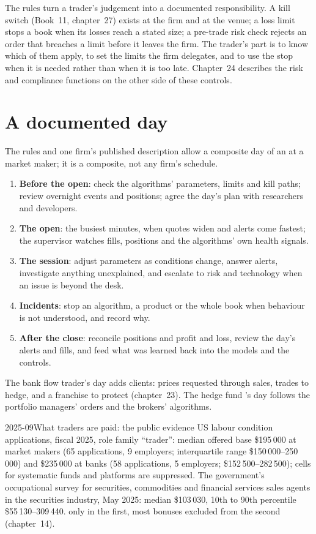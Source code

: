 The rules turn a trader's judgement into a documented responsibility. A kill switch (Book~11, chapter~27) exists at the
firm and at the venue; a loss limit stops a book when its losses reach a stated size; a pre-trade risk check rejects an
order that breaches a limit before it leaves the firm. The trader's part is to know which of them apply, to set the
limits the firm delegates, and to use the stop when it is needed rather than when it is too late. Chapter~24 describes the
risk and compliance functions on the other side of these controls.

\section{A documented day}

The rules and one firm's published description allow a composite day of an  at a market maker; it is
a composite, not any firm's schedule.
\begin{enumerate}
\item \textbf{Before the open}: check the algorithms' parameters, limits and kill paths; review overnight events and
positions; agree the day's plan with researchers and developers.
\item \textbf{The open}: the busiest minutes, when quotes widen and alerts come fastest; the supervisor watches fills,
positions and the algorithms' own health signals.
\item \textbf{The session}: adjust parameters as conditions change, answer alerts, investigate anything unexplained, and
escalate to risk and technology when an issue is beyond the desk.
\item \textbf{Incidents}: stop an algorithm, a product or the whole book when behaviour is not understood, and record why.
\item \textbf{After the close}: reconcile positions and profit and loss, review the day's alerts and fills, and feed what
was learned back into the models and the controls.
\end{enumerate}
The bank flow trader's day adds clients: prices requested through sales, trades to hedge, and a franchise to protect
(chapter~23). The hedge fund 's day follows the portfolio managers' orders and the brokers' algorithms.

\begin{dated}{2025-09}{What traders are paid: the public evidence}\label{dat:in:trader:pay}
US labour condition applications, fiscal 2025, role family ``trader'': median offered base \$195\,000 at market makers
(65 applications, 9 employers; interquartile range \$150\,000--250\,000) and \$235\,000 at banks (58 applications, 5
employers; \$152\,500--282\,500); cells for systematic funds and platforms are suppressed. The government's occupational
survey for securities, commodities and financial services sales agents in the securities industry, May 2025: median
\$103\,030, 10th to 90th percentile \$55\,130--309\,440.  only in the first, most bonuses excluded from the
second (chapter~14).
\end{dated}

